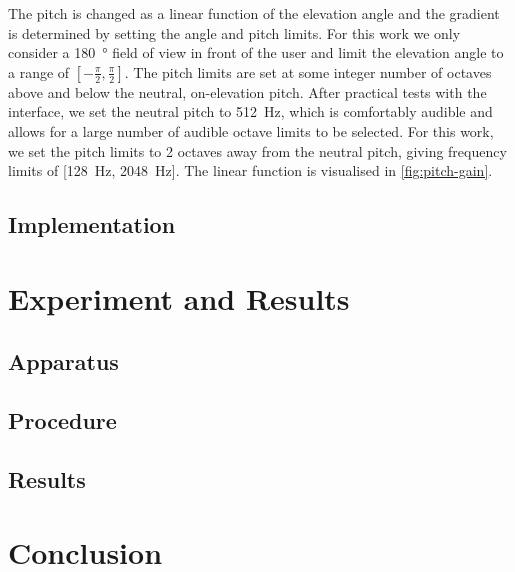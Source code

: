 \documentclass{llncs}
\begin{document}
The pitch is changed as a linear function of the elevation angle and the gradient is determined by setting the angle and pitch limits.
For this work we only consider a \SI{180}{\degree} field of view in front of the user and limit the elevation angle to a range of $[-\frac{\pi}{2}, \frac{\pi}{2}]$.
The pitch limits are set at some integer number of octaves above and below the neutral, on-elevation pitch.
After practical tests with the interface, we set the neutral pitch to \SI{512}{\hertz}, which is comfortably audible and allows for a large number of audible octave limits to be selected.
For this work, we set the pitch limits to 2 octaves away from the neutral pitch, giving frequency limits of [\SI{128}{\hertz}, \SI{2048}{\hertz}].
The linear function is visualised in \cref{fig:pitch-gain}.

\subsection{Implementation}

\section{Experiment and Results}

\subsection{Apparatus}

\subsection{Procedure}

\subsection{Results}

\section{Conclusion}

\end{document}
